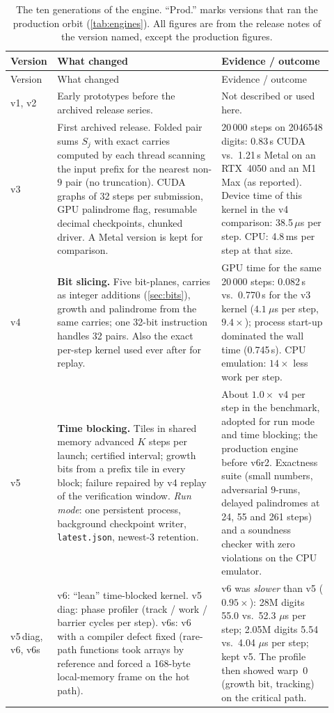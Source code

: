 \documentclass[11pt,a4paper]{article}
\newcommand{\code}[1]{\texttt{\small #1}}
\theoremstyle{remark}
\begin{document}
\begingroup\small
\setlength{\tabcolsep}{4pt}
\begin{longtable}{@{}p{0.075\linewidth}p{0.50\linewidth}p{0.34\linewidth}@{}}
\caption{The ten generations of the engine. ``Prod.'' marks versions that ran the production orbit (\cref{tab:engines}). All figures are from the release notes of the version named, except the production figures.}\label{tab:lineage}\\
\toprule
Version & What changed & Evidence / outcome\\
\midrule
\endfirsthead
\toprule
Version & What changed & Evidence / outcome\\
\midrule
\endhead
\bottomrule
\endfoot
v1, v2 & Early prototypes before the archived release series. & Not described or used here.\\
v3 & First archived release. Folded pair sums $S_j$ with exact carries computed by each thread scanning the input prefix for the nearest non-$9$ pair (no truncation). CUDA graphs of 32 steps per submission, GPU palindrome flag, resumable decimal checkpoints, chunked driver. A Metal version is kept for comparison. & 20\,000 steps on \num{2046548} digits: 0.83\,s CUDA vs.\ 1.21\,s Metal on an RTX~4050 and an M1 Max (as reported). Device time of this kernel in the v4 comparison: 38.5\,$\mu$s per step. CPU: 4.8\,ms per step at that size.\\
v4 & \textbf{Bit slicing.} Five bit-planes, carries as integer additions (\cref{sec:bits}), growth and palindrome from the same carries; one 32-bit instruction handles 32 pairs. Also the exact per-step kernel used ever after for replay. & GPU time for the same 20\,000 steps: 0.082\,s vs.\ 0.770\,s for the v3 kernel ($4.1\ \mu$s per step, $9.4\times$); process start-up dominated the wall time (0.745\,s). CPU emulation: $14\times$ less work per step.\\
v5 & \textbf{Time blocking.} Tiles in shared memory advanced $K$ steps per launch; certified interval; growth bits from a prefix tile in every block; failure repaired by v4 replay of the verification window. \emph{Run mode}: one persistent process, background checkpoint writer, \code{latest.json}, newest-3 retention. & About $1.0\times$ v4 per step in the benchmark, adopted for run mode and time blocking; the production engine before v6r2. Exactness suite (small numbers, adversarial $9$-runs, delayed palindromes at 24, 55 and 261 steps) and a soundness checker with zero violations on the CPU emulator.\\
v5\,diag, v6, v6s & v6: ``lean'' time-blocked kernel. v5\,diag: phase profiler (track / work / barrier cycles per step). v6s: v6 with a compiler defect fixed (rare-path functions took arrays by reference and forced a 168-byte local-memory frame on the hot path). & v6 was \emph{slower} than v5 ($0.95\times$): 28M digits 55.0 vs.\ 52.3 $\mu$s per step; 2.05M digits 5.54 vs.\ 4.04 $\mu$s per step; kept v5. The profile then showed warp~0 (growth bit, tracking) on the critical path.\\

\end{longtable}
\end{document}
